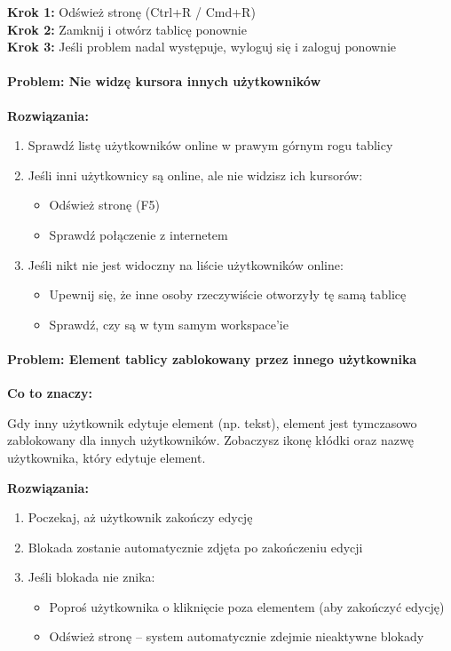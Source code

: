\documentclass[12pt,a4paper]{article}
\begin{document}
\begin{tcolorbox}[colback=green!5!white,colframe=green!75!black,title=\faLightbulb\ Szybkie rozwiązanie]
\textbf{Krok 1:} Odśwież stronę (Ctrl+R / Cmd+R)\\
\textbf{Krok 2:} Zamknij i otwórz tablicę ponownie\\
\textbf{Krok 3:} Jeśli problem nadal występuje, wyloguj się i zaloguj ponownie
\end{tcolorbox}

\paragraph{Problem: Nie widzę kursora innych użytkowników}

\textbf{Rozwiązania:}

\begin{enumerate}
    \item Sprawdź listę użytkowników online w prawym górnym rogu tablicy
    \item Jeśli inni użytkownicy są online, ale nie widzisz ich kursorów:
    \begin{itemize}
        \item Odśwież stronę (F5)
        \item Sprawdź połączenie z internetem
    \end{itemize}
    \item Jeśli nikt nie jest widoczny na liście użytkowników online:
    \begin{itemize}
        \item Upewnij się, że inne osoby rzeczywiście otworzyły tę samą tablicę
        \item Sprawdź, czy są w tym samym workspace'ie
    \end{itemize}
\end{enumerate}

\paragraph{Problem: Element tablicy zablokowany przez innego użytkownika}

\textbf{Co to znaczy:}

Gdy inny użytkownik edytuje element (np. tekst), element jest tymczasowo zablokowany dla innych użytkowników. Zobaczysz ikonę kłódki oraz nazwę użytkownika, który edytuje element.

\textbf{Rozwiązania:}

\begin{enumerate}
    \item Poczekaj, aż użytkownik zakończy edycję
    \item Blokada zostanie automatycznie zdjęta po zakończeniu edycji
    \item Jeśli blokada nie znika:
    \begin{itemize}
        \item Poproś użytkownika o kliknięcie poza elementem (aby zakończyć edycję)
        \item Odśwież stronę -- system automatycznie zdejmie nieaktywne blokady
    \end{itemize}
\end{enumerate}
\end{document}
